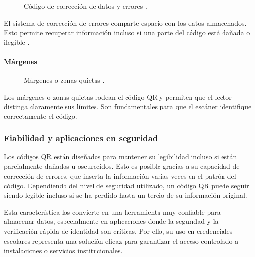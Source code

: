\begin{figure}[htbp]
	\begin{center}
		\caption{Código de corrección de datos y errores \cite{CitaA01}.}
		\label{fig:CorreccionErrores}
	\end{center}
\end{figure}

El sistema de corrección de errores comparte espacio con los datos almacenados. Esto permite recuperar información incluso si una parte del código está dañada o ilegible \cite{CitaA01}.

\paragraph{Márgenes}

\begin{figure}[htbp]
	\begin{center}
		\caption{Márgenes o zonas quietas \cite{CitaA01}.}
		\label{fig:Margenes}
	\end{center}
\end{figure}

Los márgenes o zonas quietas rodean el código QR y permiten que el lector distinga claramente sus límites. Son fundamentales para que el escáner identifique correctamente el código.

\subsubsection{Fiabilidad y aplicaciones en seguridad}

Los códigos QR están diseñados para mantener su legibilidad incluso si están parcialmente dañados u oscurecidos. Esto es posible gracias a su capacidad de corrección de errores, que inserta la información varias veces en el patrón del código. Dependiendo del nivel de seguridad utilizado, un código QR puede seguir siendo legible incluso si se ha perdido hasta un tercio de su información original.

Esta característica los convierte en una herramienta muy confiable para almacenar datos, especialmente en aplicaciones donde la seguridad y la verificación rápida de identidad son críticas. Por ello, su uso en credenciales escolares representa una solución eficaz para garantizar el acceso controlado a instalaciones o servicios institucionales.